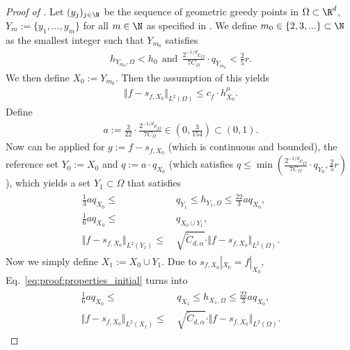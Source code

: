\documentclass[a4paper, 10pt]{article}
\begin{document}
\begin{proof}[Proof of ]
Let $(y_j)_{j \in \N}$ be the sequence of geometric greedy points in $\Omega \subset \R^d$, $Y_m := \{ y_1, ..., y_m \}$ for all $m \in \N$ as specified in .
We define $m_0 \in \{2, 3, ...\} \subset \N$ as the smallest integer such that $Y_{m_0}$ satisfies 
\begin{align*}
h_{Y_{m_0}, \Omega} < h_0 ~~ \text{and} ~~ \frac{2^{-1/d}c_\Omega}{7C_\Omega} \cdot q_{Y_{m_0}} < \frac{2}{5}r.
\end{align*}
We then define $X_0 := Y_{m_0}$. 
Then the assumption of this  yields
\begin{align*}
\Vert f - s_{f, X_{0}} \Vert_{L^2(\Omega)} \leq c_f \cdot h_{X_{0}}^\mu.
\end{align*}
Define 
\begin{align}
\label{eq:definition_a}
a := \frac{3}{22} \cdot \frac{2^{-1/d} c_\Omega}{7C_\Omega} \in \left( 0, \frac{3}{154} \right) \subset (0, 1).
\end{align}
%
%
Now  can be applied for $g := f - s_{f, X_{0}}$ (which is continuous and bounded),
the reference set $Y_0 := X_0$ and $q := a \cdot q_{X_{0}}$ (which satisfies $q \leq \min \left( \frac{2^{-1/d} c_\Omega}{7 C_\Omega} \cdot q_{Y_0}, \frac{2}{5}r \right)$ ), 
which yields a set $Y_1 \subset \Omega$ that satisfies
\begin{align}
\begin{aligned}
\label{eq:proof:properties_initial}
\frac{1}{3} a q_{X_{0}} \leq& ~ q_{Y_{1}} \leq h_{Y_{1}, \Omega} \leq \frac{22}{3} a  q_{X_{0}}, \\
\frac{1}{6} aq_{X_{0}} \leq& ~ q_{X_{0} \cup Y_{1}}, \\
\Vert f - s_{f, X_{0}} \Vert_{L^2(Y_{1})} \leq& ~ \sqrt{\tilde{C}_{d, \alpha}} \cdot \Vert f - s_{f, X_{0}} \Vert_{L^2(\Omega)}.
\end{aligned}
\end{align}
Now we simply define $X_1 := X_0 \cup Y_1$. Due to $s_{f, X_0}|_{X_0} = f|_{X_0}$,
Eq.~\eqref{eq:proof:properties_initial} turns into
\begin{align}
\begin{aligned}
\label{eq:proof:properties_initial2}
\frac{1}{6} a q_{X_{0}} \leq& ~ q_{X_{1}} \leq h_{X_{1}, \Omega} \leq \frac{22}{3} a  q_{X_{0}}, \\
\Vert f - s_{f, X_{0}} \Vert_{L^2(X_{1})} \leq& ~ \sqrt{\tilde{C}_{d, \alpha}} \cdot \Vert f - s_{f, X_{0}} \Vert_{L^2(\Omega)}.

\end{aligned}
\end{align}
\end{proof}
\end{document}
